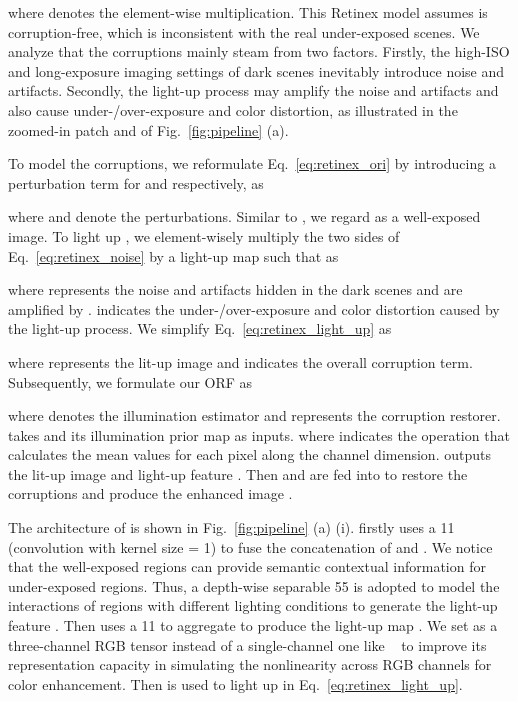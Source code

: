 \documentclass[10pt,twocolumn,letterpaper]{article}
\begin{document}
where  denotes the element-wise multiplication. This Retinex model assumes  is corruption-free, which is inconsistent with the real under-exposed scenes. We analyze that the corruptions mainly steam from two factors. Firstly, the high-ISO and long-exposure imaging settings of dark scenes inevitably introduce noise and artifacts. Secondly, the light-up process may amplify the noise and artifacts and also cause under-/over-exposure  and color distortion, as illustrated in the zoomed-in patch  \textcolor{blue}{} and \textcolor{red}{} of Fig.~\ref{fig:pipeline} (a).

To model the corruptions, we reformulate Eq.~\eqref{eq:retinex_ori} by introducing a perturbation term for  and  respectively, as
\vspace{-2.1mm}

where  and  denote the perturbations. Similar to \cite{retinex_1,lime,deep_upe}, we regard  as a well-exposed image. To light up , we element-wisely multiply the two sides of Eq.~\eqref{eq:retinex_noise} by a light-up map  such that  as
\vspace{-2mm}

where  represents the noise and artifacts hidden in the dark scenes and are amplified by .  indicates the under-/over-exposure and color distortion caused by the light-up process. We simplify Eq.~\eqref{eq:retinex_light_up} as
\vspace{-1mm}

where  represents the lit-up image and  indicates the overall corruption term. Subsequently, we formulate our ORF as
\vspace{-1.2mm}

where  denotes the illumination estimator and  represents the corruption restorer.  takes  and its  illumination prior map  as inputs.  where  indicates  the operation that calculates the mean values for each pixel along the channel dimension.  outputs the lit-up image  and light-up feature . Then  and  are  fed into  to restore the corruptions and produce the enhanced image .

The architecture of  is shown in Fig.~\ref{fig:pipeline} (a) (i).   firstly uses a 11 (convolution with kernel size = 1) to fuse the concatenation of  and . We notice that the well-exposed regions can provide semantic contextual information for under-exposed regions. Thus, a depth-wise separable 55 is adopted to model the interactions of regions with different lighting conditions to generate the light-up feature  .  Then  uses a 11 to aggregate  to produce the light-up map . We set  as a three-channel RGB tensor instead of a single-channel one like ~\cite{retinex_1,lime} to improve its representation capacity in simulating the nonlinearity across RGB channels for color enhancement. Then  is used to light up   in Eq.~\eqref{eq:retinex_light_up}. 
\end{document}
